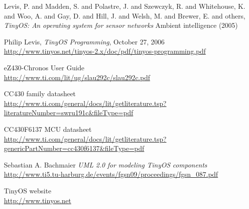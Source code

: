 \begin{thebibliography}{99}
Levis, P. and Madden, S. and Polastre, J. and Szewczyk, R. and Whitehouse, K. and Woo, A. and Gay, D. and Hill, J. and Welsh, M. and Brewer, E. and others,
\textit{TinyOS: An operating system for sensor networks}
Ambient intelligence (2005)

  Philip Levis, \textit{TinyOS Programming}, October 27, 2006 \\
  \url{http://www.tinyos.net/tinyos-2.x/doc/pdf/tinyos-programming.pdf}

  eZ430-Chronos User Guide \\
  \url{http://www.ti.com/lit/ug/slau292c/slau292c.pdf}

  CC430 family datasheet\\
  \url{http://www.ti.com/general/docs/lit/getliterature.tsp?literatureNumber=swru191c&fileType=pdf}

  CC430F6137 MCU datasheet \\
  \url{http://www.ti.com/general/docs/lit/getliterature.tsp?genericPartNumber=cc430f6137&fileType=pdf}

  Sebastian A. Bachmaier
  \textit{UML 2.0 for modeling TinyOS components} \\
  \url{http://www.ti5.tu-harburg.de/events/fgsn09/proceedings/fgsn_087.pdf}

  TinyOS website \\
  \url{http://www.tinyos.net}


\end{thebibliography}
